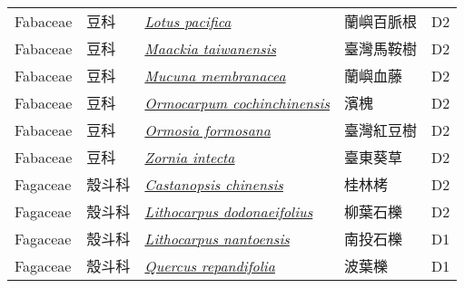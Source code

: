 {\begin{longtable}{p{2.5cm}p{2cm}p{5cm}p{2.5cm}p{3cm}}
    Fabaceae & 豆科 & \href{http://www.theplantlist.org/tpl1.1/search?q=Lotus+pacifica}{\textit{Lotus pacifica} } & 蘭嶼百脈根 & D2 \index{Lotus@\textit{Lotus}!pacifica@\textit{pacifica}}  \index{蘭嶼百脈根} \\
    Fabaceae & 豆科 & \href{http://www.theplantlist.org/tpl1.1/search?q=Maackia+taiwanensis}{\textit{Maackia taiwanensis} } & 臺灣馬鞍樹 & D2 \index{Maackia@\textit{Maackia}!taiwanensis@\textit{taiwanensis}}  \index{臺灣馬鞍樹} \\
    Fabaceae & 豆科 & \href{http://www.theplantlist.org/tpl1.1/search?q=Mucuna+membranacea}{\textit{Mucuna membranacea} } & 蘭嶼血藤 & D2 \index{Mucuna@\textit{Mucuna}!membranacea@\textit{membranacea}}  \index{蘭嶼血藤} \\
    Fabaceae & 豆科 & \href{http://www.theplantlist.org/tpl1.1/search?q=Ormocarpum+cochinchinensis}{\textit{Ormocarpum cochinchinensis} } & 濱槐 & D2 \index{Ormocarpum@\textit{Ormocarpum}!cochinchinensis@\textit{cochinchinensis}}  \index{濱槐} \\
    Fabaceae & 豆科 & \href{http://www.theplantlist.org/tpl1.1/search?q=Ormosia+formosana}{\textit{Ormosia formosana} } & 臺灣紅豆樹 & D2 \index{Ormosia@\textit{Ormosia}!formosana@\textit{formosana}}  \index{臺灣紅豆樹} \\
    Fabaceae & 豆科 & \href{http://www.theplantlist.org/tpl1.1/search?q=Zornia+intecta}{\textit{Zornia intecta} } & 臺東葵草 & D2 \index{Zornia@\textit{Zornia}!intecta@\textit{intecta}}  \index{臺東葵草} \\
    Fagaceae & 殼斗科 & \href{http://www.theplantlist.org/tpl1.1/search?q=Castanopsis+chinensis}{\textit{Castanopsis chinensis} } & 桂林栲 & D2 \index{Castanopsis@\textit{Castanopsis}!chinensis@\textit{chinensis}}  \index{桂林栲} \\
    Fagaceae & 殼斗科 & \href{http://www.theplantlist.org/tpl1.1/search?q=Lithocarpus+dodonaeifolius}{\textit{Lithocarpus dodonaeifolius} } & 柳葉石櫟 & D2 \index{Lithocarpus@\textit{Lithocarpus}!dodonaeifolius@\textit{dodonaeifolius}}  \index{柳葉石櫟} \\
    Fagaceae & 殼斗科 & \href{http://www.theplantlist.org/tpl1.1/search?q=Lithocarpus+nantoensis}{\textit{Lithocarpus nantoensis} } & 南投石櫟 & D1 \index{Lithocarpus@\textit{Lithocarpus}!nantoensis@\textit{nantoensis}}  \index{南投石櫟} \\
    Fagaceae & 殼斗科 & \href{http://www.theplantlist.org/tpl1.1/search?q=Quercus+repandifolia}{\textit{Quercus repandifolia} } & 波葉櫟 & D1 \index{Quercus@\textit{Quercus}!repandifolia@\textit{repandifolia}}  \index{波葉櫟} \\

\end{longtable}}
